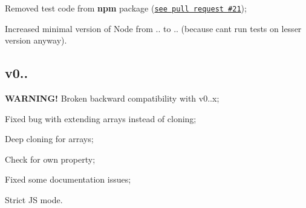 \begin{DoxyItemize}
\item Removed test code from {\bfseries npm} package (\href{https://github.com/unclechu/node-deep-extend/pull/21}{\tt see pull request \#21});
\item Increased minimal version of Node from {..} to {..} (because can\textquotesingle{}t run tests on lesser version anyway).
\end{DoxyItemize}

\subsection*{v0.. }


\begin{DoxyItemize}
\item {\bfseries W\+A\+R\+N\+I\+N\+G!} Broken backward compatibility with {\ttfamily v0..\+x};
\item Fixed bug with extending arrays instead of cloning;
\item Deep cloning for arrays;
\item Check for own property;
\item Fixed some documentation issues;
\item Strict JS mode. 
\end{DoxyItemize}